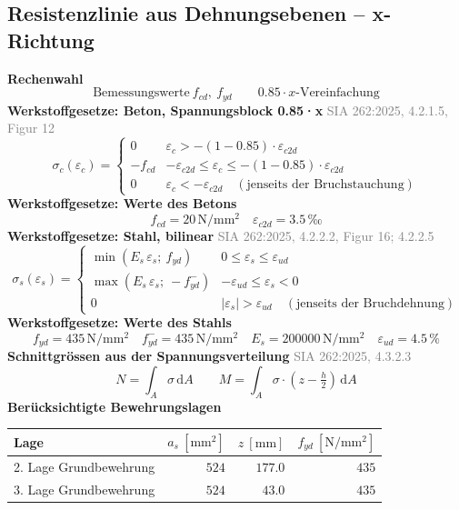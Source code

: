 \documentclass[11pt,a4paper]{article}
\newcommand{\normref}[1]{{\small\textcolor{gray}{#1}}}
\begin{document}
\subsection{Resistenzlinie aus Dehnungsebenen – x-Richtung}
\noindent\textbf{Rechenwahl}
\begin{equation*}
\text{Bemessungswerte}\ f_{cd},\ f_{yd} \qquad 0.85 \cdot x\text{-Vereinfachung}
\end{equation*}
\noindent\textbf{Werkstoffgesetze: Beton, Spannungsblock 0.85·x} \hfill \normref{SIA 262:2025, 4.2.1.5, Figur 12}
\begin{equation*}
\sigma_c(\varepsilon_c) = \begin{cases} 0 & \varepsilon_c > -(1 - 0.85) \cdot \varepsilon_{c2d} \\[1ex] -f_{cd} & -\varepsilon_{c2d} \le \varepsilon_c \le -(1 - 0.85) \cdot \varepsilon_{c2d} \\[1ex] 0 & \varepsilon_c < -\varepsilon_{c2d} \quad (\text{jenseits der Bruchstauchung}) \end{cases}
\end{equation*}
\noindent\textbf{Werkstoffgesetze: Werte des Betons}
\begin{equation*}
f_{cd} = 20\,\mathrm{N}/\mathrm{mm}^{2} \quad \varepsilon_{c2d} = 3.5\,\text{‰}
\end{equation*}
\noindent\textbf{Werkstoffgesetze: Stahl, bilinear} \hfill \normref{SIA 262:2025, 4.2.2.2, Figur 16; 4.2.2.5}
\begin{equation*}
\sigma_s(\varepsilon_s) = \begin{cases} \min(E_s\,\varepsilon_s;\ f_{yd}) & 0 \le \varepsilon_s \le \varepsilon_{ud} \\[1ex] \max(E_s\,\varepsilon_s;\ -f_{yd}^{-}) & -\varepsilon_{ud} \le \varepsilon_s < 0 \\[1ex] 0 & |\varepsilon_s| > \varepsilon_{ud} \quad (\text{jenseits der Bruchdehnung}) \end{cases}
\end{equation*}
\noindent\textbf{Werkstoffgesetze: Werte des Stahls}
\begin{equation*}
f_{yd} = 435\,\mathrm{N}/\mathrm{mm}^{2} \quad f_{yd}^{-} = 435\,\mathrm{N}/\mathrm{mm}^{2} \quad E_s = 200000\,\mathrm{N}/\mathrm{mm}^{2} \quad \varepsilon_{ud} = 4.5\,\%
\end{equation*}
\noindent\textbf{Schnittgrössen aus der Spannungsverteilung} \hfill \normref{SIA 262:2025, 4.3.2.3}
\begin{equation*}
N = \int_A \sigma\,\mathrm{d}A \qquad M = \int_A \sigma \cdot \left(z - \tfrac{h}{2}\right)\,\mathrm{d}A
\end{equation*}
\noindent\textbf{Berücksichtigte Bewehrungslagen}
\begin{longtable}{lrrr}
\hline
Lage & $a_s\ [\mathrm{mm}^2]$ & $z\ [\mathrm{mm}]$ & $f_{yd}\ [\mathrm{N/mm^2}]$ \\
\hline
\endhead
2. Lage Grundbewehrung & $524$ & $177.0$ & $435$ \\
3. Lage Grundbewehrung & $524$ & $43.0$ & $435$ \\
\hline
\end{longtable}
\end{document}
